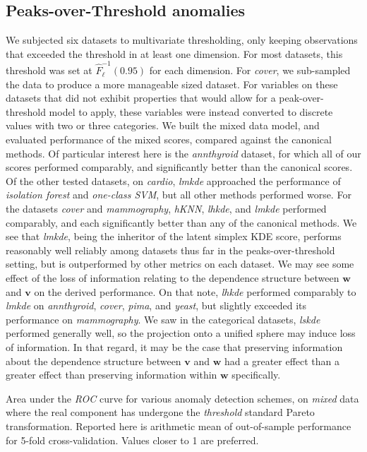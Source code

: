 \subsection{Peaks-over-Threshold anomalies}
We subjected six datasets to multivariate thresholding, only keeping 
    observations that exceeded the threshold in at least one dimension.  For 
    most datasets, this threshold was set at $\hat{F}_{\ell}^{-1}(0.95)$ for 
    each dimension.  For \emph{cover}, we sub-sampled the data to produce a 
    more manageable sized dataset.  For variables on these datasets that did 
    not exhibit properties that would allow for a peak-over-threshold model to 
    apply, these variables were instead converted to discrete values with two 
    or three categories.  We built the mixed data model, and evaluated 
    performance of the mixed scores, compared against the canonical methods.  
    Of particular interest here is the \emph{annthyroid} dataset, for which all 
    of our scores performed comparably, and significantly better than the 
    canonical scores.  Of the other tested datasets, on \emph{cardio}, 
    \emph{lmkde} approached the performance of \emph{isolation forest} and 
    \emph{one-class SVM}, but all other methods performed worse.  For the 
    datasets \emph{cover} and \emph{mammography}, \emph{hKNN}, \emph{lhkde}, 
    and \emph{lmkde} performed comparably, and each significantly better than 
    any of the canonical methods.  We see that \emph{lmkde}, being the inheritor
    of the latent simplex KDE score, performs reasonably well reliably among 
    datasets thus far in the peaks-over-threshold setting, but is outperformed 
    by other metrics on each dataset. We may see some effect of the loss of 
    information relating to the dependence structure between $\bm{w}$ and 
    $\bm{v}$ on the derived performance.  On that note, \emph{lhkde} performed 
    comparably to \emph{lmkde} on \emph{annthyroid}, \emph{cover}, \emph{pima}, 
    and \emph{yeast}, but slightly exceeded its performance on 
    \emph{mammography}.  We saw in the categorical datasets, \emph{lskde} 
    performed generally well, so the projection onto a unified sphere may 
    induce loss of information.  In that regard, it may be the case that 
    preserving information about the dependence structure between $\bm{v}$ and 
    $\bm{w}$ had a greater effect than a greater effect than preserving 
    information within $\bm{w}$ specifically.
    
\begin{table}[ht]
    \centering
    \caption{Area under the \emph{ROC} curve for various anomaly detection 
        schemes, on \emph{mixed} data where the real component has undergone 
        the \emph{threshold} standard Pareto transformation.   Reported here is 
        arithmetic mean of out-of-sample performance for 5-fold 
        cross-validation.  Values closer to 1 are preferred.
        \label{tab:perfreal}}
    \bigskip
    
\end{table}

